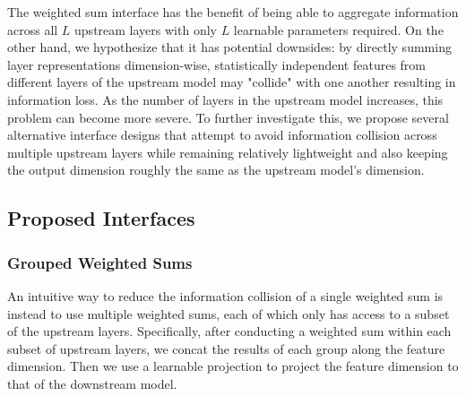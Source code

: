 The weighted sum interface has the benefit of being able to aggregate information across all $L$ upstream layers with only $L$ learnable parameters required.
On the other hand, we hypothesize that it has potential downsides: by directly summing layer representations dimension-wise, statistically independent features from different layers of the upstream model may "collide" with one another resulting in information loss.
As the number of layers in the upstream model increases, this problem can become more severe.
To further investigate this, we propose several alternative interface designs that attempt to avoid information collision across multiple upstream layers while remaining relatively lightweight and also keeping the output dimension roughly the same as the upstream model's dimension.


\subsection{Proposed Interfaces}

\subsubsection{Grouped Weighted Sums}
An intuitive way to reduce the information collision of a single weighted sum is instead to use multiple weighted sums, each of which only has access to a subset of the upstream layers.
Specifically, after conducting a weighted sum within each subset of upstream layers, we concat the results of each group along the feature dimension.
Then we use a learnable projection to project the feature dimension to that of the downstream model.


